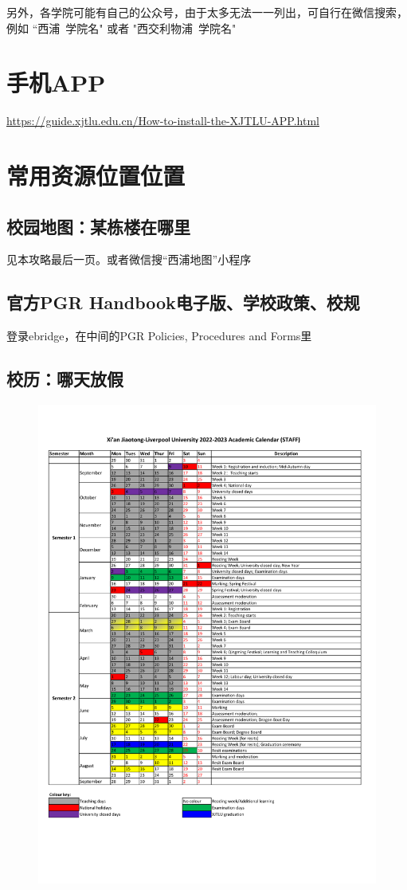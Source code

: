 另外，各学院可能有自己的公众号，由于太多无法一一列出，可自行在微信搜索，例如 “西浦\ {学院名}" 或者 "西交利物浦\ {学院名}"

\section{手机APP}
\url{https://guide.xjtlu.edu.cn/How-to-install-the-XJTLU-APP.html}

\section{常用资源位置位置}
\subsection{校园地图：某栋楼在哪里}
见本攻略最后一页。或者微信搜“西浦地图”小程序

\subsection{官方PGR Handbook电子版、学校政策、校规}
登录ebridge，在中间的PGR Policies, Procedures and Forms里

\subsection{校历：哪天放假}
\begin{figure}[H]
    \includegraphics[width=\columnwidth]{author-folder/Kai.Wu/Academic_Calendar-202223.pdf}
\end{figure}


